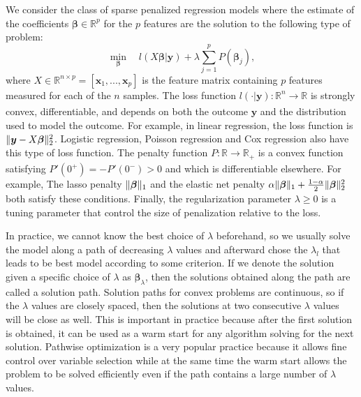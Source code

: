 We consider the class of sparse penalized regression models where the estimate of the coefficients $\boldsymbol\beta\in\mathbb{R}^p$ for the $p$ features are the solution to the following type of problem:
\begin{equation}
    \label{eq:spr}
    \underset{\boldsymbol\beta}{\min}\quad l(X\boldsymbol\beta|\boldsymbol y)+\lambda \sum_{j=1}^pP(\boldsymbol\beta_j),
\end{equation}
where $X\in\mathbb{R}^{n\times p}=[\boldsymbol x_1,...,\boldsymbol x_p]$ is the feature matrix containing $p$ features measured for each of the $n$ samples. The loss function $l(\cdot|\boldsymbol y):\mathbb{R}^n\xrightarrow[]{}\mathbb{R}$ is strongly convex, differentiable, and depends on both the outcome $\boldsymbol y$ and the distribution used to model the outcome. For example, in linear regression, the loss function is $\lVert\boldsymbol y-X\boldsymbol\beta\rVert_2^2$. Logistic regression, Poisson regression and Cox regression also have this type of loss function. The penalty function $P:\mathbb{R}\xrightarrow[]{}\mathbb{R}_+$ is a convex function satisfying $P'(0^+)=-P'(0^-)>0$ and which is differentiable elsewhere. For example, The lasso penalty $\lVert\boldsymbol\beta\rVert_1$ and the elastic net penalty $\alpha\lVert\boldsymbol\beta\rVert_1+\frac{1-\alpha}{2}\lVert\boldsymbol\beta\rVert_2^2$ both satisfy these conditions. Finally, the regularization parameter $\lambda \ge 0$ is a tuning parameter that control the size of penalization relative to the loss.

In practice, we cannot know the best choice of $\lambda$ beforehand, so we usually solve the model along a path of decreasing $\lambda$ values and afterward chose the $\lambda_l$ that leads to be best model according to some criterion. If we denote the solution given a specific choice of $\lambda$ as $\boldsymbol\beta_\lambda$, then the solutions obtained along the path are called a solution path. Solution paths for convex problems are continuous, so if the $\lambda$ values are closely spaced, then the solutions at two consecutive $\lambda$ values will be close as well. This is important in practice because after the first solution is obtained, it can be used as a warm start for any algorithm solving for the next solution. Pathwise optimization is a very popular practice because it allows fine control over variable selection while at the same time the warm start allows the problem to be solved efficiently even if the path contains a large number of $\lambda$ values. 

